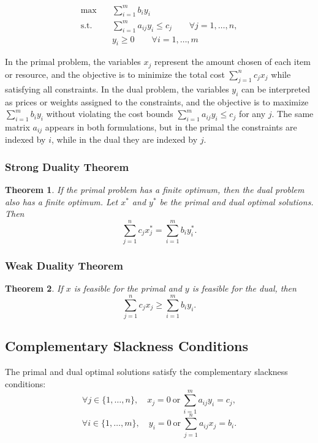 \documentclass[12pt,a4paper]{report}
\newtheorem{theorem}{Theorem}
\begin{document}
\[
\begin{aligned}
\max \quad & \sum_{i=1}^m b_i y_i \\
\text{s.t.} \quad & \sum_{i=1}^m a_{ij}y_i \le c_j \qquad \forall j=1,\dots,n, \\
& y_i \ge 0 \qquad \forall i=1,\dots,m
\end{aligned}
\]

In the primal problem, the variables $x_j$ represent the amount chosen of each item or resource, and the objective is to minimize the total cost $\sum_{j=1}^n c_j x_j$ while satisfying all constraints. In the dual problem, the variables $y_i$ can be interpreted as prices or weights assigned to the constraints, and the objective is to maximize $\sum_{i=1}^m b_i y_i$ without violating the cost bounds $\sum_{i=1}^m a_{ij}y_i \le c_j$ for any $j$. The same matrix $a_{ij}$ appears in both formulations, but in the primal the constraints are indexed by $i$, while in the dual they are indexed by $j$.

\subsubsection{Strong Duality Theorem}

\begin{theorem}
If the primal problem has a finite optimum, then the dual problem also has a finite optimum. Let $x^*$ and $y^*$ be the primal and dual optimal solutions. Then
\[
\sum_{j=1}^n c_j x_j^* = \sum_{i=1}^m b_i y_i^*.
\]
\end{theorem}

\subsubsection{Weak Duality Theorem}

\begin{theorem}
If $x$ is feasible for the primal and $y$ is feasible for the dual, then
\[
\sum_{j=1}^n c_j x_j \geq \sum_{i=1}^m b_i y_i.
\]
\end{theorem}

\subsection{Complementary Slackness Conditions}

The primal and dual optimal solutions satisfy the complementary slackness conditions:
\[
\forall j \in \{1,\dots,n\}, \quad x_j = 0 \ \text{or} \ \sum_{i=1}^m a_{ij}y_i = c_j,
\]
\[
\forall i \in \{1,\dots,m\}, \quad y_i = 0 \ \text{or} \ \sum_{j=1}^n a_{ij}x_j = b_i.
\]
\end{document}
